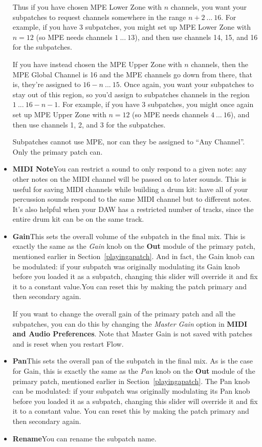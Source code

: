 \documentclass{article}
\begin{document}
\begin{itemize}
Thus if you have chosen MPE Lower Zone with \(n\) channels, you want your subpatches to request channels somewhere in the range \(n+2\ ...\ 16\).  For example, if you have 3 subpatches, you might set up MPE Lower Zone with \(n=12\) (so MPE needs channels \(1\ ...\ 13\)), and then use channels 14, 15, and 16 for the subpatches.

If you have instead chosen the MPE Upper Zone with \(n\) channels, then the MPE Global Channel is 16 and the MPE channels go down from there, that is, they're assigned to \(16 - n\ ...\ 15\). Once again, you want your subpatches to stay out of this region, so you'd assign to subpatches channels in the region \(1\ ...\ 16 - n - 1\).  For example, if you have 3 subpatches, you might once again set up MPE Upper Zone with \(n=12\) (so MPE needs channels \(4\ ...\ 16\)), and then use channels 1, 2, and 3 for the subpatches.

Subpatches cannot use MPE, nor can they be assigned to ``Any Channel''.  Only the primary patch can.

\item {\bf MIDI Note}\quad You can restrict a sound to only respond to a given note: any other notes on the MIDI channel will be passed on to later sounds.  This is useful for saving MIDI channels while building a drum kit: have all of your percussion sounds respond to the same MIDI channel but to different notes.  It's also helpful when your DAW has a restricted number of tracks, since the entire drum kit can be on the same track.

\item {\bf Gain}\quad This sets the overall volume of the subpatch in the final mix.  This is exactly the same as the {\it Gain} knob on the {\bf Out} module of the primary patch, mentioned earlier in Section~\ref{playingapatch}.  And in fact, the Gain knob can be modulated: if your subpatch was originally modulating its Gain knob before you loaded it as a subpatch, changing this slider will override it and fix it to a constant value.You can reset this by making the patch primary and then secondary again.

If you want to change the overall gain of the primary patch and all the subpatches, you can do this by changing the {\it Master Gain} option in {\bf MIDI and Audio Preferences}.   Note that Master Gain is not saved with patches and is reset when you restart Flow.

\item {\bf Pan}\quad This sets the overall pan of the subpatch in the final mix.  As is the case for Gain, this is exactly the same as the {\it Pan} knob on the {\bf Out} module of the primary patch, mentioned earlier in Section~\ref{playingapatch}.  The Pan knob can be modulated: if your subpatch was originally modulating its Pan knob before you loaded it as a subpatch, changing this slider will override it and fix it to a constant value. You can reset this by making the patch primary and then secondary again.

\item {\bf Rename}\quad You can rename the subpatch name.
\end{itemize}
\end{document}
